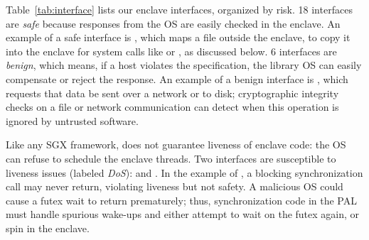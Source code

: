 Table~\ref{tab:interface} lists our \enclavecallnum{} enclave interfaces,
organized by risk.
18 interfaces are {\em safe} because responses
from the OS are easily checked in the enclave.
An example of a safe interface is ,
which maps a file outside the enclave,
to copy it into the enclave for system calls like  or , as discussed below.
6 interfaces are {\em benign}, which means, if a host violates the specification,
the library OS can easily compensate or reject the response.
An example of a benign interface is ,
which requests that data be sent over a network or to disk;
cryptographic integrity checks on a file or network communication can 
detect
when this operation is ignored by untrusted software.


Like any SGX framework, \graphenesgx{} does not guarantee liveness of enclave code: the OS can refuse to schedule the enclave threads.
Two interfaces are susceptible to liveness issues (labeled {\em DoS}):  and .
In the example of , a blocking synchronization call may never return, violating liveness but not safety.
A malicious OS could cause a futex wait to return prematurely; thus, 
synchronization code in the PAL
must handle spurious wake-ups and either attempt to wait on the futex again, or spin in the enclave.

